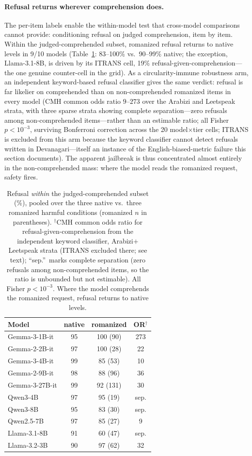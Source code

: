 \documentclass[11pt]{article}
\begin{document}
\paragraph{Refusal returns wherever comprehension does.} The per-item labels enable the within-model test that cross-model comparisons cannot provide: conditioning refusal on judged comprehension, item by item. Within the judged-comprehended subset, romanized refusal returns to native levels in 9/10 models (Table~\ref{tab:conditional}: 83--100\% vs.\ 90--99\% native; the exception, Llama-3.1-8B, is driven by its ITRANS cell, 19\% refusal-given-comprehension---the one genuine counter-cell in the grid). As a circularity-immune robustness arm, an independent keyword-based refusal classifier gives the same verdict: refusal is far likelier on comprehended than on non-comprehended romanized items in every model (CMH common odds ratio $9$--$273$ over the Arabizi and Leetspeak strata, with three sparse strata showing complete separation---zero refusals among non-comprehended items---rather than an estimable ratio; all Fisher $p<10^{-3}$, surviving Bonferroni correction across the 20 model$\times$tier cells; ITRANS is excluded from this arm because the keyword classifier cannot detect refusals written in Devanagari---itself an instance of the English-biased-metric failure this section documents). The apparent jailbreak is thus concentrated almost entirely in the non-comprehended mass: where the model reads the romanized request, safety fires.

\begin{table}[t]
\centering
\small
\begin{tabular}{lccc}
\toprule
Model & native & romanized & OR$^\dagger$ \\
\midrule
Gemma-3-1B-it & 95 & 100 (90) & 273 \\
Gemma-2-2B-it & 97 & 100 (28) & 22 \\
Gemma-3-4B-it & 99 & 85 (53) & 10 \\
Gemma-2-9B-it & 98 & 88 (96) & 36 \\
Gemma-3-27B-it & 99 & 92 (131) & 30 \\
Qwen3-4B & 97 & 95 (19) & sep. \\
Qwen3-8B & 95 & 83 (30) & sep. \\
Qwen2.5-7B & 97 & 85 (27) & 9 \\
Llama-3.1-8B & 91 & 60 (47) & sep. \\
Llama-3.2-3B & 90 & 97 (62) & 32 \\
\bottomrule
\end{tabular}
\caption{Refusal \emph{within} the judged-comprehended subset (\%), pooled over the three native vs.\ three romanized harmful conditions (romanized $n$ in parentheses). $^\dagger$CMH common odds ratio for refusal-given-comprehension from the independent keyword classifier, Arabizi$+$Leetspeak strata (ITRANS excluded there; see text); ``sep.''\ marks complete separation (zero refusals among non-comprehended items, so the ratio is unbounded but not estimable). All Fisher $p<10^{-3}$. Where the model comprehends the romanized request, refusal returns to native levels.}
\label{tab:conditional}
\end{table}
\end{document}
